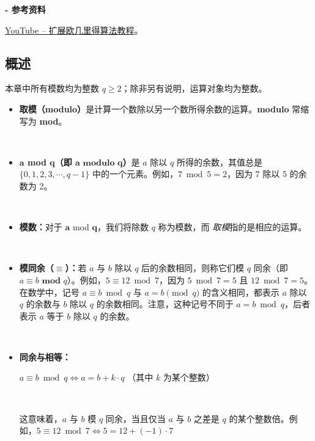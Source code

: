 
\noindent \textbf{- 参考资料}

\href{https://www.youtube.com/watch?v=fz1vxq5ts5I}{YouTube -- 扩展欧几里得算法教程}。


\subsection{概述}
\label{subsec:modulo-overview}

本章中所有模数均为整数 $q\ge 2$；除非另有说明，运算对象均为整数。

\begin{tcolorbox}[title={\textbf{\tboxdef{\ref*{subsec:modulo-overview}} 整数取模}}]

\begin{itemize}

\item \textbf{取模（modulo）}是计算一个数除以另一个数所得余数的运算。\textbf{modulo} 常缩写为 \textbf{mod}。

$ $

\item \textbf{$\bm{a}$ mod $\bm{q}$（即 $\bm{a} \bm{\text{ modulo } q}$）}是 $a$ 除以 $q$ 所得的余数，其值总是 $\{0, 1, 2, 3, \cdots, q-1\}$ 中的一个元素。例如，$7 \bmod 5 = 2$，因为 7 除以 5 的余数为 2。

$ $

\item \textbf{模数：}对于 $\bm{a}$ mod $\bm{q}$，我们将除数 $q$ 称为模数，而 \emph{取模}指的是相应的运算。

$ $

\item \textbf{模同余（$\bm{\equiv}$）：}若 $a$ 与 $b$ 除以 $q$ 后的余数相同，则称它们模 $q$ 同余（即 $a \equiv b \textbf{ mod } q$）。例如，$5 \equiv 12 \bmod 7$，因为 $5 \bmod 7 = 5$ 且 $12 \bmod 7 = 5$。在数学中，记号 $a \equiv b \bmod q$ 与 $a = b \pmod q$ 的含义相同，都表示 $a$ 除以 $q$ 的余数与 $b$ 除以 $q$ 的余数相同。注意，这种记号不同于 $a = b \bmod q$，后者表示 $a$ 等于 $b$ 除以 $q$ 的余数。

$ $

\item \textbf{同余与相等：}

$a \equiv b \bmod q \Longleftrightarrow a = b + k\cdot q$ \text{ }（其中 $k$ 为某个整数）

$ $

这意味着，$a$ 与 $b$ 模 $q$ 同余，当且仅当 $a$ 与 $b$ 之差是 $q$ 的某个整数倍。例如，$5 \equiv 12 \bmod 7 \Longleftrightarrow 5 = 12 + (-1)\cdot 7$

\end{itemize}

\end{tcolorbox}


